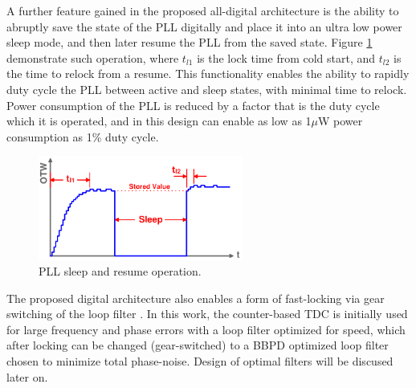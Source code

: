	A further feature gained in the proposed all-digital architecture is the ability to abruptly save the state of the PLL digitally and place it into an ultra low power sleep mode, and then later resume the PLL from the saved state. Figure \ref{fig:pll_sleep} demonstrate such operation, where $t_{l1}$ is the lock time from cold start, and $t_{l2}$ is the time to relock from a resume. This functionality enables the ability to rapidly duty cycle the PLL between active and sleep states, with minimal time to relock. Power consumption of the PLL is reduced by a factor that is the duty cycle which it is operated, and in this design can enable as low as 1$\mu$W power consumption as 1\% duty cycle. 

			\begin{figure}[htb!]
			        \centering
			        \includegraphics[width=0.6\textwidth, angle=0]{./figs/design/pll_sleep}
			    \caption{PLL sleep and resume operation.}
			    \label{fig:pll_sleep}
			\end{figure}



The proposed digital architecture also enables a form of fast-locking via gear switching of the loop filter \cite{staszewski_balsara_2007}. In this work, the counter-based TDC is initially used for large frequency and phase errors with a loop filter optimized for speed, which after locking can be changed (gear-switched) to a BBPD optimized loop filter chosen to minimize total phase-noise. Design of optimal filters will be discused later on.

	
